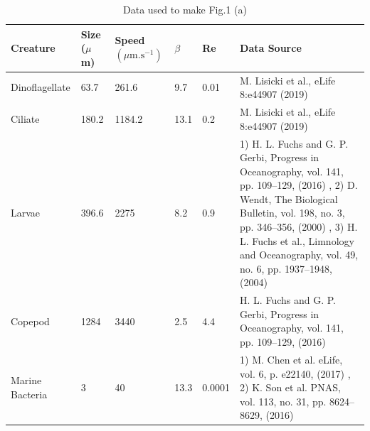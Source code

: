 \documentclass[../Rajarshi-thesis-draft.tex]{subfiles}
\begin{document}
\begin{table}[h]
 \begin{center}
 \label{act-table_organism}
\begin{tabular}{ |p{2.5cm}| p{1cm}|p{1.3cm}|p{1cm}| p{1.3cm} | p{5cm} |  }
 \hline
 Creature&Size ($\mu$m) & Speed $(\mu \text{m.s}^{-1})$ & $\beta$ & Re & Data Source\\
 \hline
  Dinoflagellate & 63.7 & 261.6 & 9.7 & 0.01 & M. Lisicki et al., eLife 8:e44907 (2019) \cite{Lauga2019} \\
  Ciliate & 180.2 & 1184.2 & 13.1 & 0.2 & M. Lisicki et al., eLife 8:e44907 (2019) \cite{Lauga2019} \\
  Larvae & 396.6 & 2275 & 8.2 & 0.9 & 1) H. L. Fuchs and G. P. Gerbi, Progress in Oceanography, vol. 141, pp. 109–129, (2016) \cite{FUCHS2016109}, 2) D. Wendt, The Biological Bulletin, vol. 198, no. 3, pp. 346–356, (2000) \cite{Wendt2000}, 3) H. L. Fuchs et al., Limnology and Oceanography, vol. 49, no. 6, pp. 1937–1948, (2004) \cite{Fuchs2004} \\ %
  Copepod & 1284 & 3440 &2.5 & 4.4 & H. L. Fuchs and G. P. Gerbi, Progress in Oceanography, vol. 141, pp. 109–129, (2016) \cite{FUCHS2016109} \\
  Marine Bacteria & 3 & 40	& 13.3	& 0.0001 & 1) M. Chen et al. eLife, vol. 6, p. e22140, (2017) \cite{10.7554/eLife.22140}, 2) K. Son et al.
PNAS, vol. 113, no. 31, pp. 8624–8629, (2016) \cite{doi:10.1073/pnas.1602307113} \\
 \hline
\end{tabular}
\end{center}
\caption[Organism data used in the motility figure]{Data used to make Fig.1 (a)}
\end{table}
\end{document}
